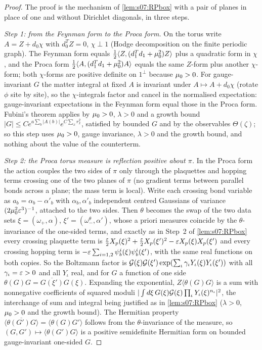 \begin{proof}
The proof is the mechanism of \cref{lem:s07:RPbox} with a pair of planes in place of one and without Dirichlet diagonals, in three steps.

\emph{Step 1: from the Feynman form to the Proca form.} On the torus write $A=Z+d_0\chi$ with $d_0^TZ=0$, $\chi\perp1$ (Hodge decomposition on the finite periodic graph). The Feynman form equals $\frac12\langle Z,(d_1^Td_1+\mu_0^2)Z\rangle$ plus a quadratic form in $\chi$, and the Proca form $\frac12\langle A,(d_1^Td_1+\mu_0^2)A\rangle$ equals the same $Z$-form plus another $\chi$-form; both $\chi$-forms are positive definite on $1^\perp$ because $\mu_0>0$. For gauge-invariant $G$ the matter integral at fixed $A$ is invariant under $A\mapsto A+d_0\chi$ (rotate $\phi$ site by site), so the $\chi$-integrals factor and cancel in the normalised expectation: gauge-invariant expectations in the Feynman form equal those in the Proca form. Fubini's theorem applies by $\mu_0>0$, $\lambda>0$ and a growth bound $|G|\le Ce^{a\sum_b|A(b)|}e^{C\sum_xr_x^2}$, satisfied by bounded $G$ and by the observables $\Theta(\zeta)$; so this step uses $\mu_0>0$, gauge invariance, $\lambda>0$ and the growth bound, and nothing about the value of the counterterm.

\emph{Step 2: the Proca torus measure is reflection positive about $\pi$.} In the Proca form the action couples the two sides of $\pi$ only through the plaquettes and hopping terms crossing one of the two planes of $\pi$ (no gradient terms between parallel bonds across a plane; the mass term is local). Write each crossing bond variable as $a_b=\alpha_b-\alpha'_b$ with $\alpha_b,\alpha'_b$ independent centred Gaussians of variance $(2\mu_0^2\varepsilon^3)^{-1}$, attached to the two sides. Then $\theta$ becomes the swap of the two data sets $\xi=(\omega_+,\alpha)$, $\xi'=(\omega_-^\theta,\alpha')$, whose a priori measures coincide by the $\theta$-invariance of the one-sided terms, and exactly as in Step~2 of \cref{lem:s07:RPbox} every crossing plaquette term is $\frac{\varepsilon}2X_p(\xi)^2+\frac{\varepsilon}2X_p(\xi')^2-\varepsilon X_p(\xi)X_p(\xi')$ and every crossing hopping term is $-\varepsilon\sum_{i=1,2}\psi^i_b(\xi)\psi^i_b(\xi')$, with the same real functions on both copies. So the Boltzmann factor is $\mathcal G(\xi)\mathcal G(\xi')\exp(\sum_\iota\gamma_\iota Y_\iota(\xi)Y_\iota(\xi'))$ with all $\gamma_\iota=\varepsilon>0$ and all $Y_\iota$ real, and for $G$ a function of one side $\theta(G)G=\overline{G(\xi')}G(\xi)$. Expanding the exponential, $Z\langle\theta(G)G\rangle$ is a sum with nonnegative coefficients of squared moduli $|\int d\xi\,G(\xi)\mathcal G(\xi)\prod_\iota Y_\iota(\xi)^{n_\iota}|^2$, the interchange of sum and integral being justified as in \cref{lem:s07:RPbox} ($\lambda>0$, $\mu_0>0$ and the growth bound). The Hermitian property $\overline{\langle\theta(G')G\rangle}=\langle\theta(G)G'\rangle$ follows from the $\theta$-invariance of the measure, so $(G,G')\mapsto\langle\theta(G')G\rangle$ is a positive semidefinite Hermitian form on bounded gauge-invariant one-sided $G$.


\end{proof}
